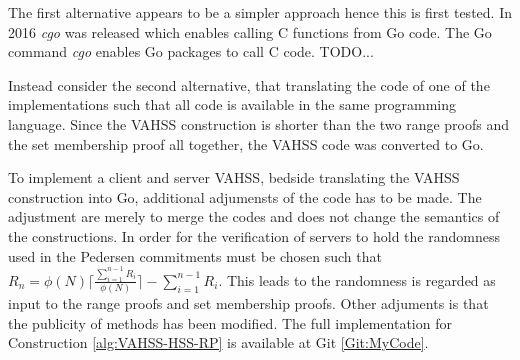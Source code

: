 The first alternative appears to be a simpler approach hence this is first tested. In 2016 \textit{cgo} was released which enables calling C functions from Go code. 
The Go command \textit{cgo} enables Go packages to call C code. TODO...

Instead consider the second alternative, that translating the code of one of the implementations such that all code is available in the same programming language. Since the VAHSS construction is  shorter than the two range proofs and the set membership proof all together, the VAHSS code was converted to Go.

To implement a client and server VAHSS, bedside translating the VAHSS construction into Go, additional adjumensts of the code has to be made. The adjustment are merely to merge the codes and does not change the semantics of the constructions. In order for the verification of servers to hold the randomness used in the Pedersen commitments must be chosen such that $R_n = \phi(N)\lceil \frac{\sum_{i=1}^{n-1}R_i}{\phi(N)}\rceil- \sum_{i=1}^{n-1}R_i$. This leads to the randomness is regarded as input to the range proofs and set membership proofs. Other adjuments is that the publicity of methods has been modified. The full implementation for Construction \ref{alg:VAHSS-HSS-RP} is available at Git \ref{Git:MyCode}. 



